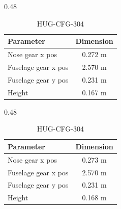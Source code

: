 \begin{table}[H]
    \begin{subtable}[t]{0.48\textwidth}
        \centering
        \caption{HUG-CFG-303}
        \begin{tabularx}{\linewidth}{|@{}X c@{}|}
            \hline
            \textbf{Parameter} & \textbf{Dimension}  \\
            \hline \hline
            Nose gear x pos &0.272 m \\
            Fuselage gear x pos &  2.570 m\\
            Fuselage gear y pos & 0.231 m\\
            Height & 0.167 m\\
            \hline
        \end{tabularx}
    \end{subtable}
    \hfill
    \begin{subtable}[t]{0.48\textwidth}
        \centering
        \caption{HUG-CFG-304}
        \begin{tabularx}{\linewidth}{|@{}X c@{}|}
            \hline
            \textbf{Parameter} & \textbf{Dimension }  \\
            \hline \hline
            
            Nose gear x pos &0.273 m \\
            Fuselage gear x pos &  2.570 m\\
            Fuselage gear y pos & 0.231 m\\
            Height & 0.168 m\\
            \hline
        \end{tabularx}
    \end{subtable}

    \vspace{0.5cm}

\end{table}



